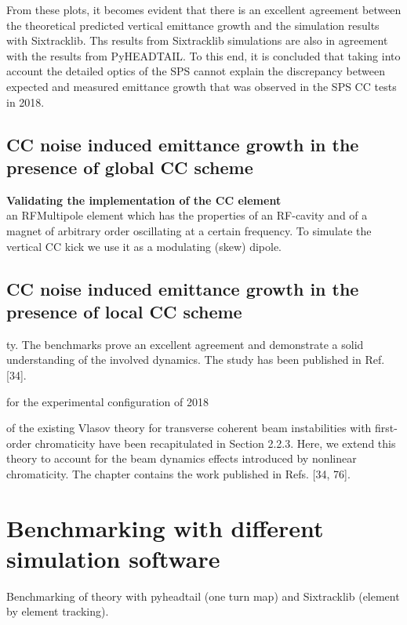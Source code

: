 From these plots, it becomes evident that there is an excellent agreement between the theoretical predicted vertical emittance growth and the simulation results with Sixtracklib. Ths results from Sixtracklib simulations are also in agreement with the results from PyHEADTAIL. To this end, it is concluded that taking into account the detailed optics of the SPS cannot explain the discrepancy between expected and measured emittance growth that was observed in the SPS CC tests in 2018.

\subsection{CC noise induced emittance growth in the presence of global CC scheme}\label{subsec:global_CC}


\textbf{Validating the implementation of the CC element}\\



an RFMultipole element which  has the properties of an RF-cavity and of a magnet of arbitrary order oscillating at a certain frequency. To simulate the vertical CC kick we use it as a modulating (skew) dipole.



\subsection{CC noise induced emittance growth in the presence of local CC scheme}\label{subsec:local_CC}

\newpage



ty. The
benchmarks prove an excellent agreement and demonstrate a solid understanding of the involved
dynamics. The study has been published in Ref. [34].


for the experimental configuration of 2018 

of the existing Vlasov theory for transverse coherent beam instabilities with first-order
chromaticity have been recapitulated in Section 2.2.3. Here, we extend this theory to account for the
beam dynamics effects introduced by nonlinear chromaticity. The chapter contains the work published
in Refs. [34, 76].




\section{Benchmarking with different simulation software}
Benchmarking of theory with pyheadtail (one turn map) and Sixtracklib (element by element tracking).




